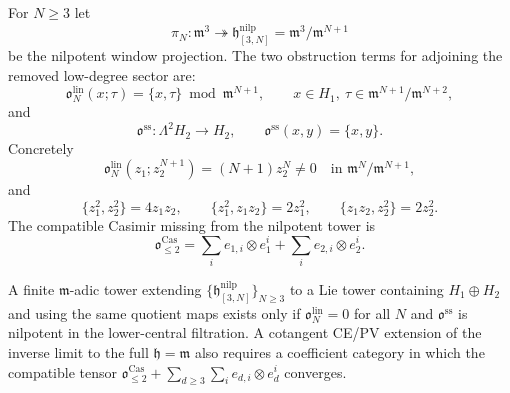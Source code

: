 \begin{defn}
\label{defn:nilpotent-low-degree-obstruction-terms}
  For \(N\geq3\) let
  \[
    \pi_N\colon\mathfrak m^3\twoheadrightarrow
    \mathfrak h^{\mathrm{nilp}}_{[3,N]}=\mathfrak m^3/\mathfrak m^{N+1}
  \]
  be the nilpotent window projection.  The two obstruction terms for
  adjoining the removed low-degree sector are:
  \[
    \mathfrak o^{\mathrm{lin}}_N(x;\tau)
      =\{x,\tau\}\bmod \mathfrak m^{N+1},
      \qquad
      x\in H_1,\ \tau\in \mathfrak m^{N+1}/\mathfrak m^{N+2},
  \]
  and
  \[
    \mathfrak o^{\mathrm{ss}}\colon\Lambda^2H_2\to H_2,\qquad
    \mathfrak o^{\mathrm{ss}}(x,y)=\{x,y\}.
  \]
  Concretely
  \[
    \mathfrak o^{\mathrm{lin}}_N(z_1;z_2^{N+1})
      =(N+1)z_2^N\neq0
      \quad\text{in }\mathfrak m^N/\mathfrak m^{N+1},
  \]
  and
  \[
    \{z_1^2,z_2^2\}=4z_1z_2,\qquad
    \{z_1^2,z_1z_2\}=2z_1^2,\qquad
    \{z_1z_2,z_2^2\}=2z_2^2 .
  \]
  The compatible Casimir missing from the nilpotent tower is
  \[
    \mathfrak o^{\mathrm{Cas}}_{\leq2}
      =\sum_i e_{1,i}\otimes e_1^i
       +\sum_i e_{2,i}\otimes e_2^i .
  \]
\end{defn}

\begin{lem}
\label{lem:nilpotent-obstructions-exact}
  A finite \(\mathfrak m\)-adic tower extending
  \(\{\mathfrak h^{\mathrm{nilp}}_{[3,N]}\}_{N\geq3}\) to a Lie tower containing
  \(H_1\oplus H_2\) and using the same quotient maps exists only if
  \(\mathfrak o^{\mathrm{lin}}_N=0\) for all \(N\) and
  \(\mathfrak o^{\mathrm{ss}}\) is nilpotent in the lower-central
  filtration.  A cotangent CE/PV extension of the inverse limit to the
  full \(\mathfrak h=\mathfrak m\) also requires a coefficient category
  in which the compatible tensor
  \(\mathfrak o^{\mathrm{Cas}}_{\leq2}
    +\sum_{d\geq3}\sum_i e_{d,i}\otimes e_d^i\)
  converges.
\end{lem}

